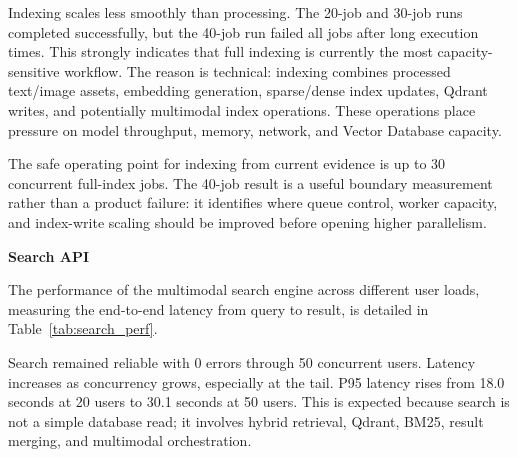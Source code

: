 Indexing scales less smoothly than processing. The 20-job and 30-job runs completed successfully, but the 40-job run failed all jobs after long execution times. This strongly indicates that full indexing is currently the most capacity-sensitive workflow. The reason is technical: indexing combines processed text/image assets, embedding generation, sparse/dense index updates, Qdrant writes, and potentially multimodal index operations. These operations place pressure on model throughput, memory, network, and Vector Database capacity.

The safe operating point for indexing from current evidence is up to 30 concurrent full-index jobs. The 40-job result is a useful boundary measurement rather than a product failure: it identifies where queue control, worker capacity, and index-write scaling should be improved before opening higher parallelism.



\textbf{Search API}

The performance of the multimodal search engine across different user loads, measuring the end-to-end latency from query to result, is detailed in Table~\ref{tab:search_perf}.

\begin{table}[H]
    \centering
    \caption{Search Performance Matrix.}
    \label{tab:search_perf}
\end{table}

Search remained reliable with 0 errors through 50 concurrent users. Latency increases as concurrency grows, especially at the tail. P95 latency rises from 18.0 seconds at 20 users to 30.1 seconds at 50 users. This is expected because search is not a simple database read; it involves hybrid retrieval, Qdrant, BM25, result merging, and multimodal orchestration.

